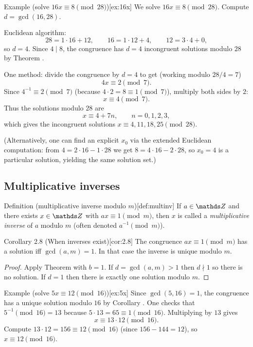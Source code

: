 \documentclass[10pt]{article}
\theoremstyle{definition}
\theoremstyle{plain}
\numberwithin{equation}{section}
\begin{document}
\begin{define}{Example (solve $16x\equiv 8\pmod{28}$)}[ex:16x]
We solve $16x\equiv 8\pmod{28}$. Compute $d=\gcd(16,28)$.

Euclidean algorithm:
\[
28 = 1\cdot 16 + 12,\qquad 16 = 1\cdot 12 + 4,\qquad 12 = 3\cdot 4 + 0,
\]
so $d=4$. Since $4\mid 8$, the congruence has $d=4$ incongruent solutions modulo $28$
by Theorem .

One method: divide the congruence by $d=4$ to get (working modulo $28/4=7$)
\[
4x \equiv 2 \pmod{7}.
\]
Since $4^{-1}\equiv 2\pmod{7}$ (because $4\cdot 2=8\equiv1\pmod{7}$), multiply both sides by $2$:
\[
x\equiv 4\pmod{7}.
\]
Thus the solutions modulo $28$ are
\[
x\equiv 4+7n,\qquad n=0,1,2,3,
\]
which gives the incongruent solutions $x\equiv 4,11,18,25\pmod{28}$.

(Alternatively, one can find an explicit $x_0$ via the extended Euclidean computation:
from $4=2\cdot 16 -1\cdot 28$ we get $8=4\cdot 16 -2\cdot 28$, so $x_0=4$ is a
particular solution, yielding the same solution set.)
\end{define}

\subsection*{Multiplicative inverses}

\begin{define}{Definition (multiplicative inverse modulo $m$)}[def:multinv]
If $a\in\setZ$ and there exists $x\in\setZ$ with $ax\equiv 1\pmod{m}$,
then $x$ is called a \emph{multiplicative inverse} of $a$ modulo $m$ (often denoted
$a^{-1}\pmod{m}$).
\end{define}

\begin{define}{Corollary 2.8 (When inverses exist)}[cor:2.8]
The congruence $ax\equiv 1\pmod{m}$ has a solution iff $\gcd(a,m)=1$. In that case
the inverse is unique modulo $m$.
\end{define}

\begin{proof}
Apply Theorem  with $b=1$. If $d=\gcd(a,m)>1$ then $d\nmid 1$ so there is
no solution. If $d=1$ then there is exactly one solution modulo $m$.
\end{proof}

\begin{define}{Example (solve $5x\equiv 12\pmod{16}$)}[ex:5x]
Since $\gcd(5,16)=1$, the congruence has a unique solution modulo $16$ by
Corollary . One checks that $5^{-1}\pmod{16}=13$ because $5\cdot 13=65\equiv 1\pmod{16}$.
Multiplying by $13$ gives
\[
x\equiv 13\cdot 12 \pmod{16}.
\]
Compute $13\cdot 12 =156 \equiv 12 \pmod{16}$ (since $156-144=12$), so $x\equiv 12\pmod{16}$.
\end{define}
\end{document}
